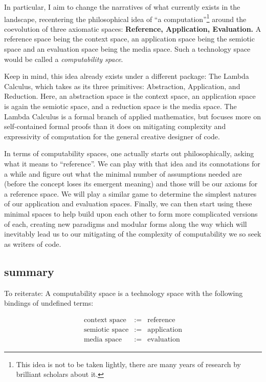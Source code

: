 \documentclass[twoside]{article}
\begin{document}
In particular, I aim to change the narratives of what currently exists in the landscape, recentering the philosophical idea of
``a computation''\footnote{This idea is not to be taken lightly, there are many years of research by brilliant scholars about it.}
around the coevolution of three axiomatic spaces: {\bfseries Reference, Application, Evaluation.} A reference space being the context
space, an application space being the semiotic space and an evaluation space being the media space. Such a technology space would be
called a \emph{computability space}.

Keep in mind, this idea already exists under a different package: The Lambda Calculus, which takes as its three primitives: Abstraction,
Application, and Reduction. Here, an abstraction space is the context space, an application space is again the semiotic space, and a
reduction space is the media space. The Lambda Calculus is a formal branch of applied mathematics, but focuses more on self-contained
formal proofs than it does on mitigating complexity and expressivity of computation for the general creative designer of code.

In terms of computability spaces, one actually starts out philosophically, asking what it means to ``reference''. We can play with that
idea and its connotations for a while and figure out what the minimal number of assumptions needed are (before the concept loses its
emergent meaning) and those will be our axioms for a reference space. We will play a similar game to determine the simplest natures
of our application and evaluation spaces. Finally, we can then start using these minimal spaces to help build upon each other to form
more complicated versions of each, creating new paradigms and modular forms along the way which will inevitably lead us to our mitigating
of the complexity of computability we so seek as writers of code.

\subsection*{summary}

To reiterate: A computability space is a technology space with the following bindings of undefined terms:

\begin{eqnarray}
\mbox{context space} & := & \mbox{reference} \\
\mbox{semiotic space} & := & \mbox{application} \\
\mbox{media space} & := & \mbox{evaluation}
\end{eqnarray}
\end{document}
